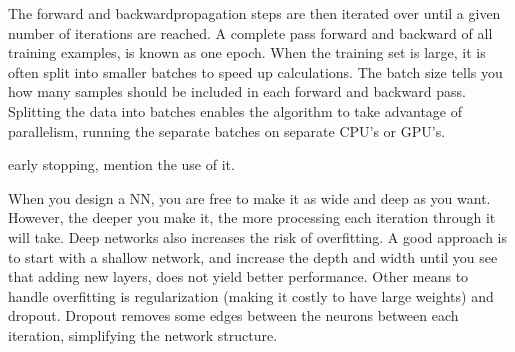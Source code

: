         The forward and backwardpropagation steps are then iterated over until a given number of iterations are reached. A complete pass forward and backward of all training examples, is known as one epoch. When the training set is large, it is often split into smaller batches to speed up calculations. The batch size tells you how many samples should be included in each forward and backward pass. Splitting the data into batches enables the algorithm to take advantage of parallelism, running the separate batches on separate CPU's or GPU's. 
        
        early stopping, mention the use of it. 
            
        When you design a NN, you are free to make it as wide and deep as you want. However, the deeper you make it, the more processing each iteration through it will take. Deep networks also increases the risk of overfitting. A good approach is to start with a shallow network, and increase the depth and width until you see that adding new layers, does not yield better performance. Other means to handle overfitting is regularization (making it costly to have large weights) and dropout. Dropout removes some edges between the neurons between each iteration, simplifying the network structure. 
    
